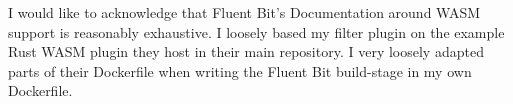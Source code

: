 \documentclass[bsc]{report/media/abdnthesis}
\begin{document}
\begin{acknowledgements}
I would like to acknowledge that Fluent Bit's Documentation around WASM support is reasonably exhaustive. I loosely based my filter plugin on the example Rust WASM plugin they host in their main repository. I very loosely adapted parts of their Dockerfile when writing the Fluent Bit build-stage in my own Dockerfile.

\end{acknowledgements}

\def\sfthing#1#2{\def#1{\mbox{{\small\normalfont\sffamily #2}}}}

\sfthing{\PP}{P}
\sfthing{\FF}{F}

\printglossary[type=\acronymtype]
\printglossary
\tableofcontents
\lstlistoflistings{}







% 

\appendix





\end{document}
